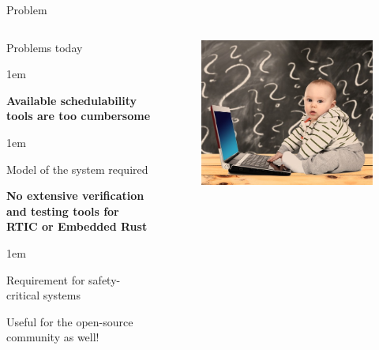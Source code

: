 \begin{frame}{Problem}
    \begin{columns}
        \begin{block}{Problems today}
            \begin{itemize-size}{1em}
                \item \textbf{Available schedulability tools are too cumbersome}
                    \begin{itemize-size}{1em}
                        \item Model of the system required
                    \end{itemize-size}
                \item \textbf{No extensive verification and testing tools for RTIC or Embedded Rust}
                    \begin{itemize-size}{1em}
                        \item Requirement for safety-critical systems
                        \item Useful for the open-source community as well!
                    \end{itemize-size}
            \end{itemize-size}
        \end{block}

        \begin{figure}
           \centering
            \includegraphics[scale=0.2]{pictures/problem.png}
        \end{figure}
    \end{columns}
\end{frame}

